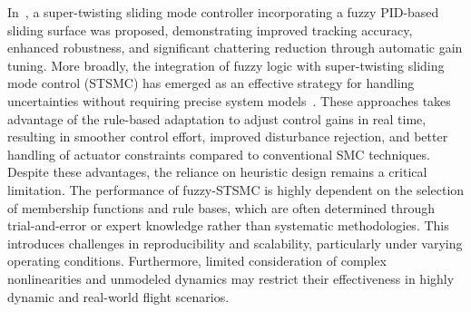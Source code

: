 

\noindent In~\cite{gedefaw2024improved}, a super-twisting sliding mode controller incorporating a fuzzy PID-based sliding surface was proposed, demonstrating improved tracking accuracy, enhanced robustness, and significant chattering reduction through automatic gain tuning. More broadly, the integration of fuzzy logic with super-twisting sliding mode control (STSMC) has emerged as an effective strategy for handling uncertainties without requiring precise system models~\cite{gedefaw2024improved,roy2024design}. These approaches takes advantage of the rule-based adaptation to adjust control gains in real time, resulting in smoother control effort, improved disturbance rejection, and better handling of actuator constraints compared to conventional SMC techniques. Despite these advantages, the reliance on heuristic design remains a critical limitation. The performance of fuzzy-STSMC is highly dependent on the selection of membership functions and rule bases, which are often determined through trial-and-error or expert knowledge rather than systematic methodologies. This introduces challenges in reproducibility and scalability, particularly under varying operating conditions. Furthermore, limited consideration of complex nonlinearities and unmodeled dynamics may restrict their effectiveness in highly dynamic and real-world flight scenarios.




